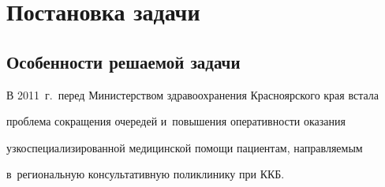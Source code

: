 









\vspace*{-12pt}



















      \thispagestyle{headings}


  


\section{Постановка задачи}





\vspace*{-6pt}





\subsection{Особенности решаемой задачи}





\vspace*{-2pt}


  


  В 2011~г.\ перед Министерством здравоохранения Красноярского края встала 


проблема сокращения очередей и~повышения оперативности оказания 


узкоспециализированной медицинской помощи пациентам, направляемым 


в~региональную консультативную поликлинику при ККБ.


